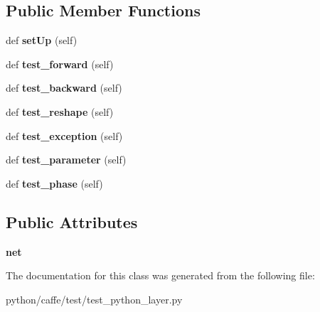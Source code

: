 \subsection*{Public Member Functions}
\begin{DoxyCompactItemize}
\item 
\mbox{\label{classtest__python__layer_1_1_test_python_layer_a92caa30cfd251d89a3b749732e32311a}} 
def {\bfseries set\+Up} (self)
\item 
\mbox{\label{classtest__python__layer_1_1_test_python_layer_a62f12e77e948803bb7e8ca991a61a400}} 
def {\bfseries test\+\_\+forward} (self)
\item 
\mbox{\label{classtest__python__layer_1_1_test_python_layer_a412a085a926adef9cc07061c0920803d}} 
def {\bfseries test\+\_\+backward} (self)
\item 
\mbox{\label{classtest__python__layer_1_1_test_python_layer_ac51f16c7dc35da4db4843d8f33738180}} 
def {\bfseries test\+\_\+reshape} (self)
\item 
\mbox{\label{classtest__python__layer_1_1_test_python_layer_a4d0c9701a53520108f69c0d2b4d675d9}} 
def {\bfseries test\+\_\+exception} (self)
\item 
\mbox{\label{classtest__python__layer_1_1_test_python_layer_a58cda881a49836756661d6d4f8a5aa6d}} 
def {\bfseries test\+\_\+parameter} (self)
\item 
\mbox{\label{classtest__python__layer_1_1_test_python_layer_a12558c187058667c02b102170c9b4170}} 
def {\bfseries test\+\_\+phase} (self)
\end{DoxyCompactItemize}
\subsection*{Public Attributes}
\begin{DoxyCompactItemize}
\item 
\mbox{\label{classtest__python__layer_1_1_test_python_layer_a512551c8f5cda5a451a198b1d73a8295}} 
{\bfseries net}
\end{DoxyCompactItemize}


The documentation for this class was generated from the following file\+:\begin{DoxyCompactItemize}
\item 
python/caffe/test/test\+\_\+python\+\_\+layer.\+py\end{DoxyCompactItemize}
